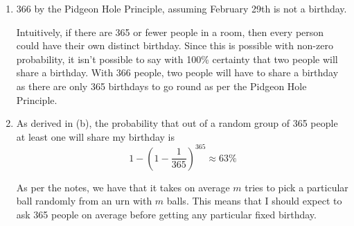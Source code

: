 \begin{enumerate}
\item

366 by the Pidgeon Hole Principle, assuming February 29th is not a birthday. 

Intuitively, if there are 365 or fewer people in a room, then every person could
have their own distinct birthday. Since this is possible with non-zero
probability, it isn't possible to say with 100\% certainty that two people will
share a birthday. With 366 people, two people will have to share a birthday as
there are only 365 birthdays to go round as per the Pidgeon Hole Principle.
\item 

As derived in (b), the probability that out of a random group of 365 people at
least one will share my birthday is 
\[1 - \left(1 - \frac{1}{365}\right)^{365} \approx 63\%\]

As per the notes\cite{Slides_46}, we have that it takes on average $m$ tries to
pick a particular ball randomly from an urn with $m$ balls. This means that I
should expect to ask 365 people on average before getting any particular fixed
birthday.
\end{enumerate}
